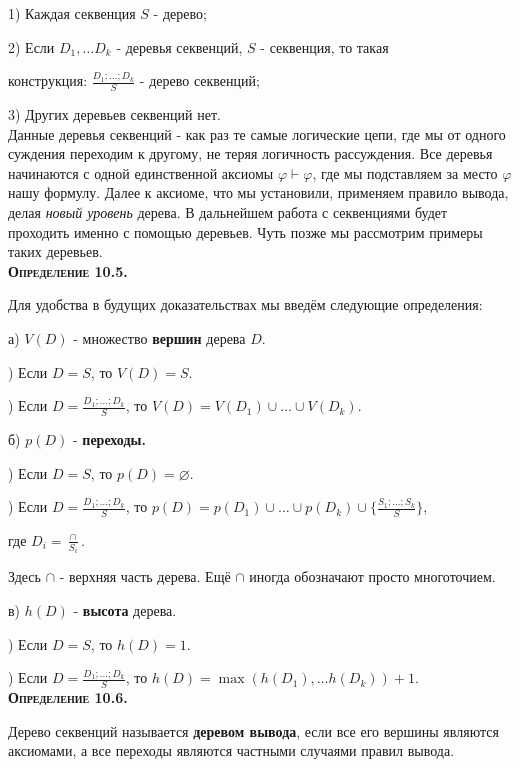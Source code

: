 \documentclass[18pt, a4paper]{extarticle}
\newcommand{\vp}{\varphi}
\newcommand{\vd}{\vdash}
\begin{document}
1) Каждая секвенция $S$ -  дерево;

2) Если $D_1,\ldots D_k$ -  деревья секвенций, $S$ -  секвенция, то такая 

конструкция: $\displaystyle \frac{D_1;\ldots;D_k}{S}$ -  дерево секвенций;

3) Других деревьев секвенций нет.\\

Данные деревья секвенций - как раз те самые логические цепи, где мы от одного суждения переходим к другому, не теряя логичность рассуждения. Все деревья начинаются с одной единственной аксиомы $\vp\vd\vp$, где мы подставляем за место $\vp$ нашу формулу. Далее к аксиоме, что мы установили, применяем правило вывода, делая \textit{новый уровень} дерева. В дальнейшем работа с секвенциями будет проходить именно с помощью деревьев. Чуть позже мы рассмотрим примеры таких деревьев.\\

\textbf{\textsc{Определение 10.5.}}

Для удобства в будущих доказательствах мы введём следующие определения:

а) $V(D)$ -  множество \textbf{вершин} дерева $D$.

) Если $D = S$, то $V(D) = S$.

) Если $D = \displaystyle \frac{D_1;\ldots;D_k}{S}$, то $V(D) = V(D_1)\cup\ldots\cup V(D_k)$.

б) $p(D)$ -  \textbf{переходы.}

) Если $D = S$, то $p(D) = \varnothing$.

) Если $D = \displaystyle \frac{D_1;\ldots;D_k}{S}$, то $p(D) = p(D_1)\cup\ldots\cup p(D_k) \cup \displaystyle \Big\{ \frac{S_1;\ldots;S_k}{S}\Big\}$,

\qquad где $D_i = \displaystyle\frac{\cap}{S_i}$.

Здесь $\cap$ - верхняя часть дерева. Ещё $\cap$ иногда обозначают просто многоточием.

в) $h(D)$ -  \textbf{высота} дерева.

) Если $D = S$, то $h(D) = 1$.

) Если $D = \displaystyle \frac{D_1;\ldots;D_k}{S}$, то $h(D) = \max (h(D_1),\ldots h(D_k)) + 1$.\\

\textbf{\textsc{Определение 10.6.}} 

Дерево секвенций называется \textbf{деревом вывода}, если все его вершины являются аксиомами, а все переходы являются частными случаями правил вывода.\\
\end{document}
